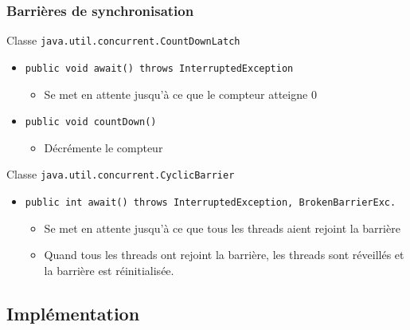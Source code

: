 \begin{frame} 
  \frametitle{Barrières de synchronisation}

  \begin{exampleblock}{Classe \lstinline+java.util.concurrent.CountDownLatch+}
    \begin{itemize}
    \item \lstinline+public void await() throws InterruptedException+\\
      \begin{itemize}
      \item Se met en attente jusqu'à ce que le compteur atteigne 0
      \end{itemize}
      \medskip
    \item \lstinline+public void countDown()+\\
      \begin{itemize}
      \item Décrémente le compteur
      \end{itemize}
    \end{itemize}
  \end{exampleblock}

  \bigskip
  
  \begin{exampleblock}{Classe \lstinline{java.util.concurrent.CyclicBarrier}}
    \begin{itemize}
    \item\lstinline{public int await() throws InterruptedException, BrokenBarrierExc.}\\
      \begin{itemize}
      \item Se met en attente jusqu'à ce que tous les threads aient rejoint la barrière
      \item Quand tous les threads ont rejoint la barrière, les threads sont réveillés et la barrière est réinitialisée.
      \end{itemize}
      \end{itemize}
  \end{exampleblock}
  
\end{frame}

\subsection{Implémentation}

